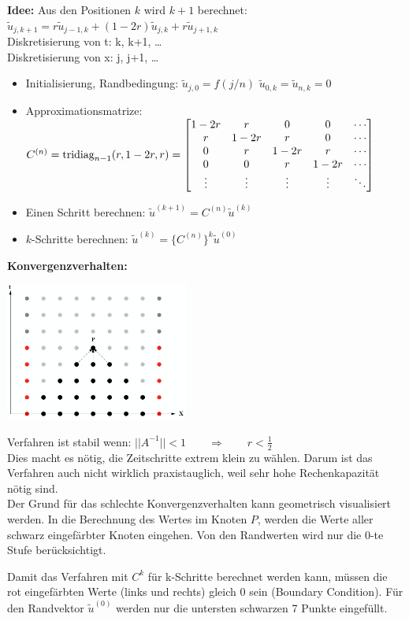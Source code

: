 \textbf{Idee:} Aus den Positionen $k$ wird $k+1$ berechnet: $\tilde{u}_{j,k+1} = r \tilde{u}_{j-1,k} + (1-2r)\tilde{u}_{j,k} + r \tilde{u}_{j+1,k}$\\
Diskretisierung von t: k, k+1, \ldots\\
Diskretisierung von x: j, j+1, \ldots\\

\begin{itemize}
\item Initialisierung, Randbedingung: $\tilde{u}_{j,0}=f(j/n)$ \qquad $\tilde{u}_{0,k}=\tilde{u}_{n,k}=0$
\item Approximationsmatrize: $C^{(n)}=\operatorname{tridiag}_{n-1}(r,1-2r,r)=\begin{bmatrix}
1-2r& r		& 0		& 0 	&\cdots\\
r	& 1-2r  & r		& 0		&\cdots\\
0	& r		& 1-2r 	& r 	&\cdots\\
0	& 0		& r		& 1-2r 	&\cdots\\
\vdots&	\vdots&\vdots&\vdots&\ddots	
\end{bmatrix}$ 
\item Einen Schritt berechnen: $\tilde{u}^{(k+1)}=C^{(n)} \tilde{u}^{(k)}$
\item $k$-Schritte berechnen: $\tilde{u}^{(k)}=\big\{C^{(n)}\big\}^k \tilde{u}^{(0)}$
\end{itemize}

\textbf{Konvergenzverhalten:} \\

\begin{minipage}{6cm}
\includegraphics[width=6cm]{Content/Numerik/KonvExplizit.png}
\end{minipage}
\hfill
\begin{minipage}{12cm}
Verfahren ist stabil wenn: $||A^{-1}|| < 1 \qquad \Rightarrow\qquad r < \frac{1}{2}$\\

Dies macht es nötig, die Zeitschritte extrem klein zu wählen. Darum ist das Verfahren auch nicht wirklich praxistauglich, weil sehr hohe Rechenkapazität nötig sind.\\

Der Grund für das schlechte Konvergenzverhalten kann geometrisch visualisiert werden. In die Berechnung des Wertes im Knoten $P$, werden die Werte aller schwarz eingefärbter Knoten eingehen. Von den Randwerten wird nur die 0-te Stufe berücksichtigt.
\end{minipage}
Damit das Verfahren mit $C^k$ für k-Schritte berechnet werden kann, müssen die
rot eingefärbten Werte (links und rechts) gleich 0 sein (Boundary Condition).
Für den Randvektor $\tilde{u}^{(0)}$ werden nur die untersten schwarzen 7 Punkte
eingefüllt.

